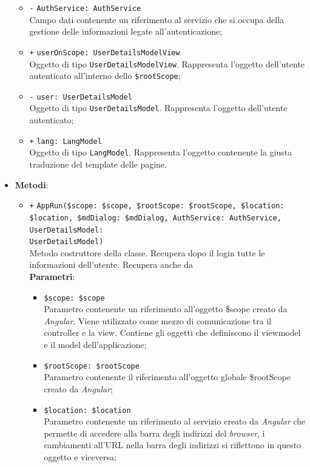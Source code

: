 \begin{itemize}
\begin{itemize}
				\item \texttt{-} \texttt{AuthService: AuthService} \\
				Campo dati contenente un riferimento al servizio che si occupa della gestione delle informazioni legate all'autenticazione;
				\item \texttt{+} \texttt{userOnScope: UserDetailsModelView} \\
				Oggetto di tipo \texttt{UserDetailsModelView}. Rappresenta l'oggetto dell'utente autenticato all'interno dello \texttt{\$rootScope};
				\item \texttt{-} \texttt{user: UserDetailsModel} \\
				Oggetto di tipo \texttt{UserDetailsModel}. Rappresenta l'oggetto dell'utente autenticato;
				\item \texttt{+} \texttt{lang: LangModel} \\
				Oggetto di tipo \texttt{LangModel}. Rappresenta l'oggetto contenente la giusta traduzione del template delle pagine.
			\end{itemize}
			\item \textbf{Metodi}: 
			\begin{itemize}
				\item \texttt{+} \texttt{AppRun(\$scope: \$scope, \$rootScope: \$rootScope, \$location: \$location, \$mdDialog: \$mdDialog, AuthService: AuthService, UserDetailsModel: \\UserDetailsModel)} \\
				Metodo costruttore della classe. Recupera dopo il login tutte le informazioni dell'utente. Recupera anche da  \\
				\textbf{Parametri}:
				\begin{itemize}
					\item \texttt{\$scope: \$scope} \\
					Parametro contenente un riferimento all’oggetto \$scope creato da \textit{Angular}. Viene utilizzato come mezzo di comunicazione tra il controller e la view. Contiene gli oggetti che definiscono il viewmodel e il model dell’applicazione;
					\item \texttt{\$rootScope: \$rootScope} \\
					Parametro contenente il riferimento all'oggetto globale \$rootScope creato da \textit{Angular};
					\item \texttt{\$location: \$location} \\
					Parametro contenente un riferimento al servizio creato da \textit{Angular} che permette di accedere alla barra degli indirizzi del \textit{browser}, i cambiamenti all’URL nella barra degli indirizzi si riflettono in questo oggetto e viceversa;

\end{itemize}
\end{itemize}
\end{itemize}

